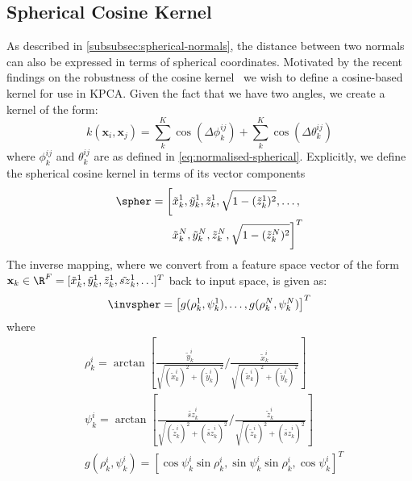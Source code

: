 \subsection{Spherical Cosine Kernel}\label{subsec:cosine-kernel}
As described in \cref{subsubsec:spherical-normals}, the distance between
two normals can also be expressed in terms of spherical coordinates. Motivated
by the recent findings on the robustness of the cosine 
kernel~\cite{tzimiropoulos2012subspace,tzimiropoulos2010robust} 
we wish to define a cosine-based kernel for use in KPCA. Given the
fact that we have two angles, we create a kernel of the form:
\begin{equation}\label{eq:spher-cosine-kernel}
    k(\mathbf{x}_i, \mathbf{x}_j) = \sum^K_k \cos(\Delta \phi^{ij}_k) + \sum^K_k \cos(\Delta \theta^{ij}_k)
\end{equation}
where $\phi^{ij}_k$ and $\theta^{ij}_k$ are as defined in 
\cref{eq:normalised-spherical}. Explicitly, we define the spherical 
cosine kernel in terms of its vector components
\begin{equation}
    \begin{aligned}\label{eq:spher-kernel}
        \spher = \left[
                    \tilde{x}_k^1, \tilde{y}_k^1, \tilde{z}_k^1, \sqrt{1 - (\tilde{z}_k^1)^2}, \ldots, \right. \\
                    \left. \tilde{x}_k^N, \tilde{y}_k^N, \tilde{z}_k^N, \sqrt{1 - (\tilde{z}_k^N)^2}
                \right]^T
    \end{aligned}
\end{equation}
The inverse mapping, where we convert from a feature space vector of the form
$\mathbf{x}_k \in \R^F = [\tilde{x}_k^1, \tilde{y}_k^1, \tilde{z}_k^1,\tilde{sz}_k^1, \ldots]^T$ 
back to input space, is given as:
\begin{equation}\label{eq:inv-spher-kernel}
    \invspher = \left[ g (\rho_k^1, \psi_k^1), \ldots, g (\rho_k^N, \psi_k^N) \right]^T
\end{equation}
where 
\begin{equation}
    \begin{aligned}\label{eq:inv-spher-g}
        &\rho_k^i = \arctan [ \frac{\tilde{y}_k^i}{\sqrt{(\tilde{x}_k^i)^2 + (\tilde{y}_k^i)^2}} / \frac{\tilde{x}_k^i}{\sqrt{(\tilde{x}_k^i)^2 + (\tilde{y}_k^i)^2}} ] \\
        &\psi_k^i = \arctan [ \frac{\tilde{sz}_k^i}{\sqrt{(\tilde{z}_k^i)^2 + (\tilde{sz}_k^i)^2}} / \frac{\tilde{z}_k^i}{\sqrt{(\tilde{z}_k^i)^2 + (\tilde{sz}_k^i)^2}} ] \\
        &g(\rho_k^i, \psi_k^i) = [\cos \psi_k^i \sin \rho_k^i, \sin \psi_k^i \sin \rho_k^i, \cos \psi_k^i]^T
    \end{aligned}
\end{equation}
